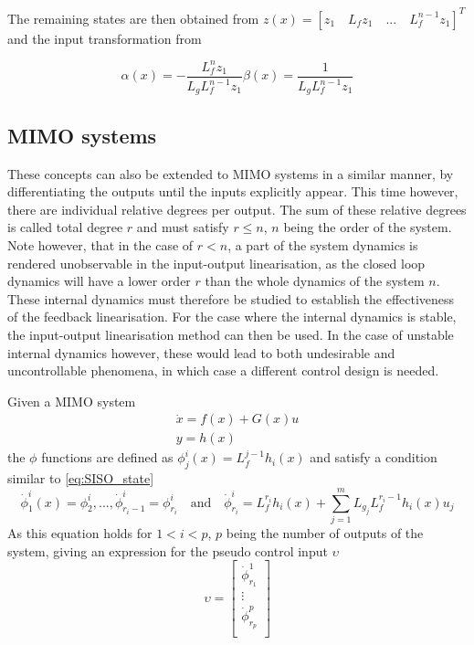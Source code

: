 The remaining states are then obtained from $z(x) = [z_1 \quad L_fz_1 \quad ... \quad L_f^{n-1}z_1]^T$ and the input transformation from

\begin{subequations}
	\begin{equation}
		\alpha (x) = - \dfrac{L_f^nz_1}{L_gL_f^{n-1}z_1}
	\end{equation}
	\begin{equation}
		\beta (x) = \dfrac{1}{L_gL_f^{n-1}z_1}
	\end{equation}
\end{subequations}

\subsection{MIMO systems}
\label{section:background/MIMO_NLI}

These concepts can also be extended to MIMO systems in a similar manner, by differentiating the outputs until the inputs explicitly appear. This time however, there are individual relative degrees per output. The sum of these relative degrees is called total degree $r$ and must satisfy $r\leq n$, $n$ being the order of the system. Note however, that in the case of $r<n$, a part of the system dynamics is rendered unobservable in the input-output linearisation, as the closed loop dynamics will have a lower order $r$ than the whole dynamics of the system $n$. These internal dynamics must therefore be studied to establish the effectiveness of the feedback linearisation. For the case where the internal dynamics is stable, the input-output linearisation method can then be used. In the case of unstable internal dynamics however, these would lead to both undesirable and uncontrollable phenomena, in which case a different control design is needed.

Given a MIMO system 
\begin{gather}
\dot{x} = f(x) + G(x)u\\
y=h(x)
\end{gather}
the $\phi$ functions are defined as $\phi^i_j(x)=L^{j-1}_fh_i(
x)$ and satisfy a condition similar to \ref{eq:SISO_state} 
\begin{equation}
\dot{\phi}^i_1(x)=\phi^i_2,...,\dot{\phi}^i_{r_i-1}=\phi^i_{r_i} \quad \text{and} \quad \dot{\phi}^i_{r_i}=L_f^{r_i}h_i(x)+\sum^m_{j=1}L_{g_j}L^{r_i-1}_fh_i(x)u_j
\end{equation}
As this equation holds for $1<i<p$, $p$ being the number of outputs of the system, giving an expression for the pseudo control input $\upsilon$
\begin{equation}
\upsilon = 
\begin{bmatrix}
\dot{\phi}^1_{r_1}\\
\vdots\\
\dot{\phi}^p_{r_p}\\
\end{bmatrix}
\end{equation}

